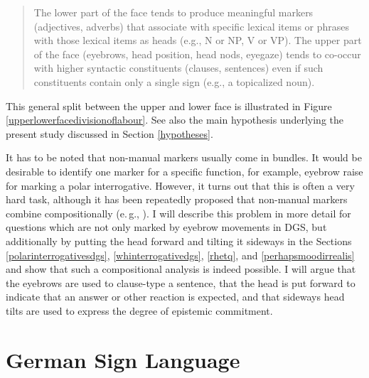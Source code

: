 \begin{quote}
The lower part\label{wilburquote} of the face tends to produce meaningful markers (adjectives, adverbs) that associate with specific lexical items or phrases with those lexical items as heads (e.g., N or NP, V or VP). The upper part of the face (eyebrows, head position, head nods, eyegaze) tends to co-occur with higher syntactic constituents (clauses, sentences) even if such constituents contain only a single sign (e.g., a topicalized noun). 
\end{quote}

\noindent This general split between the upper and lower face is illustrated in Figure \ref{upperlowerfacedivisionoflabour}. See also the main hypothesis underlying the present study discussed in Section \ref{hypotheses}.


It has to be noted that non-manual markers usually come in bundles. It would be desirable to identify one marker for a specific function, for example, eyebrow raise for marking a polar interrogative. However, it turns out that this is often a very hard task, although it has been repeatedly proposed that non-manual markers combine compositionally (e.\,g., \citealt{nespor1999prosody, sandler2006sign, dachkovsky2009visual, herrmann2013modal}). I will describe this problem in more detail for questions which are not only marked by eyebrow movements in DGS, but additionally by putting the head forward and tilting it sideways in the Sections \ref{polarinterrogativesdgs}, \ref{whinterrogativedgs}, \ref{rhetq}, and \ref{perhapsmoodirrealis} and show that such a compositional analysis is indeed possible. I will argue that the eyebrows are used to clause-type a sentence, that the head is put forward to indicate that an answer or other reaction is expected, and that sideways head tilts are used to express the degree of epistemic commitment.







\section{German Sign Language}\label{basicclausstructuredgs}


